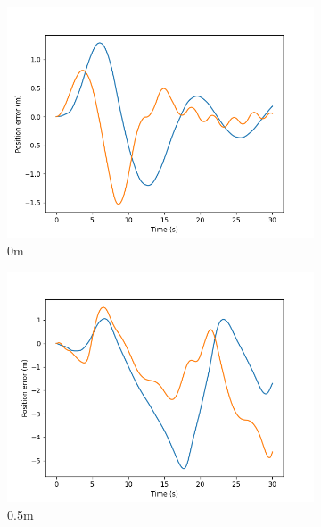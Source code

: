 \documentclass[class=article, crop=false]{standalone}
\begin{document}
\begin{figure}
    \centering
    \begin{subfigure}[b]{0.48\textwidth}
        \centering
        \includegraphics{scenario1/rov-50m/0.0m/rov_position_error_controlled}
        \caption{0m}
        \label{}
    \end{subfigure}
    \hfill
    \begin{subfigure}[b]{0.48\textwidth}
        \centering
        \includegraphics{scenario1/rov-50m/0.5m/rov_position_error_controlled}
        \caption{0.5m}
        \label{}
    \end{subfigure}
    \vfill
    \begin{subfigure}[b]{0.48\textwidth}
        \centering

\end{subfigure}
\end{figure}
\end{document}
